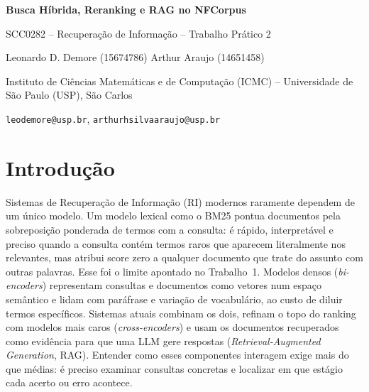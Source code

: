 \documentclass[10pt,a4paper]{article}
\begin{document}
\begin{center}
{\LARGE\bfseries Busca Híbrida, Reranking e RAG no NFCorpus\par}
\vspace{3pt}
{\large SCC0282 -- Recuperação de Informação -- Trabalho Prático 2\par}
\vspace{12pt}
{\large Leonardo D. Demore (15674786) \qquad Arthur Araujo (14651458)\par}
\vspace{4pt}
{\small Instituto de Ciências Matemáticas e de Computação (ICMC) -- Universidade de São Paulo (USP), São Carlos\par}
\vspace{2pt}
{\small\texttt{leodemore@usp.br}, \texttt{arthurhsilvaaraujo@usp.br}\par}
\end{center}

\section{Introdução}

Sistemas de Recuperação de Informação (RI) modernos raramente dependem de um único modelo. Um modelo lexical como o BM25 pontua documentos pela sobreposição ponderada de termos com a consulta: é rápido, interpretável e preciso quando a consulta contém termos raros que aparecem literalmente nos relevantes, mas atribui score zero a qualquer documento que trate do assunto com outras palavras. Esse foi o limite apontado no Trabalho~1. Modelos densos (\emph{bi-encoders}) representam consultas e documentos como vetores num espaço semântico e lidam com paráfrase e variação de vocabulário, ao custo de diluir termos específicos. Sistemas atuais combinam os dois, refinam o topo do ranking com modelos mais caros (\emph{cross-encoders}) e usam os documentos recuperados como evidência para que uma LLM gere respostas (\emph{Retrieval-Augmented Generation}, RAG). Entender como esses componentes interagem exige mais do que médias: é preciso examinar consultas concretas e localizar em que estágio cada acerto ou erro acontece.
\end{document}
